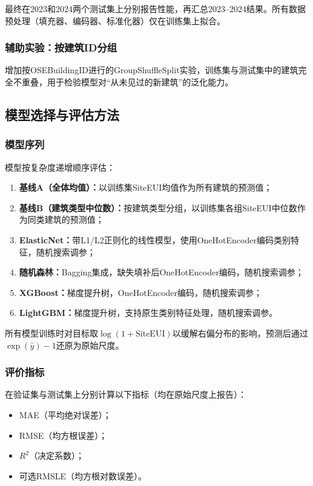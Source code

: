 最终在2023和2024两个测试集上分别报告性能，再汇总2023--2024结果。所有数据预处理（填充器、编码器、标准化器）仅在训练集上拟合。

\subsubsection{辅助实验：按建筑ID分组}

增加按OSEBuildingID进行的GroupShuffleSplit实验，训练集与测试集中的建筑完全不重叠，用于检验模型对``从未见过的新建筑''的泛化能力。

\subsection{模型选择与评估方法}

\subsubsection{模型序列}

模型按复杂度递增顺序评估：

\begin{enumerate}
    \item \textbf{基线A（全体均值）：}以训练集SiteEUI均值作为所有建筑的预测值；
    \item \textbf{基线B（建筑类型中位数）：}按建筑类型分组，以训练集各组SiteEUI中位数作为同类建筑的预测值；
    \item \textbf{ElasticNet：}带L1/L2正则化的线性模型，使用OneHotEncoder编码类别特征，随机搜索调参；
    \item \textbf{随机森林：}Bagging集成，缺失填补后OneHotEncoder编码，随机搜索调参；
    \item \textbf{XGBoost：}梯度提升树，OneHotEncoder编码，随机搜索调参；
    \item \textbf{LightGBM：}梯度提升树，支持原生类别特征处理，随机搜索调参。
\end{enumerate}

所有模型训练时对目标取$\log(1+\text{SiteEUI})$以缓解右偏分布的影响，预测后通过$\exp(\hat{y})-1$还原为原始尺度。

\subsubsection{评价指标}

在验证集与测试集上分别计算以下指标（均在原始尺度上报告）：
\begin{itemize}
    \item MAE（平均绝对误差）；
    \item RMSE（均方根误差）；
    \item $R^2$（决定系数）；
    \item 可选RMSLE（均方根对数误差）。
\end{itemize}

